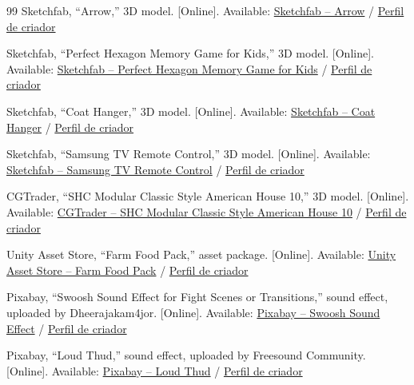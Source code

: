 \documentclass[12pt,a4paper,oneside]{report}
\begin{document}
\begin{thebibliography}{99}
Sketchfab, ``Arrow,'' 3D model. [Online]. Available:
\href{https://sketchfab.com/3d-models/arrow-ce17b17e2c13469bbaf0e4db1a84ddef}{Sketchfab -- Arrow} /
\href{https://sketchfab.com/Urielgc}{Perfil de criador}

Sketchfab, ``Perfect Hexagon Memory Game for Kids,'' 3D model. [Online]. Available:
\href{https://sketchfab.com/3d-models/perfect-hexagon-memory-game-for-kids-834aa5611918422ba58ab7b108fcb91f}{Sketchfab -- Perfect Hexagon Memory Game for Kids} /
\href{https://sketchfab.com/livrosparacriancas}{Perfil de criador}

Sketchfab, ``Coat Hanger,'' 3D model. [Online]. Available:
\href{https://sketchfab.com/3d-models/coat-hanger-af0789da863949fdaaf873627228d530}{Sketchfab -- Coat Hanger} /
\href{https://sketchfab.com/laanita}{Perfil de criador}

Sketchfab, ``Samsung TV Remote Control,'' 3D model. [Online]. Available:
\href{https://sketchfab.com/3d-models/samsung-tv-remote-control-f1bbc61a42b94ee9a2976ca744f8962e}{Sketchfab -- Samsung TV Remote Control} /
\href{https://sketchfab.com/tidominer}{Perfil de criador}

CGTrader, ``SHC Modular Classic Style American House 10,'' 3D model. [Online]. Available:
\href{https://www.cgtrader.com/3d-models/interior/house-interior/shc-modular-classic-style-american-house-10}{CGTrader -- SHC Modular Classic Style American House 10} /
\href{https://www.cgtrader.com/designers/denniswoo1993}{Perfil de criador}

Unity Asset Store, ``Farm Food Pack,'' asset package. [Online]. Available:
\href{https://assetstore.unity.com/packages/3d/props/food/farm-food-pack-21732}{Unity Asset Store -- Farm Food Pack} /
\href{https://assetstore.unity.com/publishers/3741}{Perfil de criador}

Pixabay, ``Swoosh Sound Effect for Fight Scenes or Transitions,'' sound effect, uploaded by Dheerajakam4jor. [Online]. Available:
\href{https://pixabay.com/pt/sound-effects/filme-e-efeitos-especiais-swoosh-sound-effect-for-fight-scenes-or-transitions-1-149889/}{Pixabay -- Swoosh Sound Effect} / 
\href{https://pixabay.com/pt/users/dheerajakam4jor-36410348/}{Perfil de criador}

Pixabay, ``Loud Thud,'' sound effect, uploaded by Freesound Community. [Online]. Available:
\href{https://pixabay.com/pt/sound-effects/filme-e-efeitos-especiais-loud-thud-45719/}{Pixabay -- Loud Thud} / 
\href{https://pixabay.com/pt/users/freesound_community-46691455/}{Perfil de criador}


\end{thebibliography}
\end{document}
